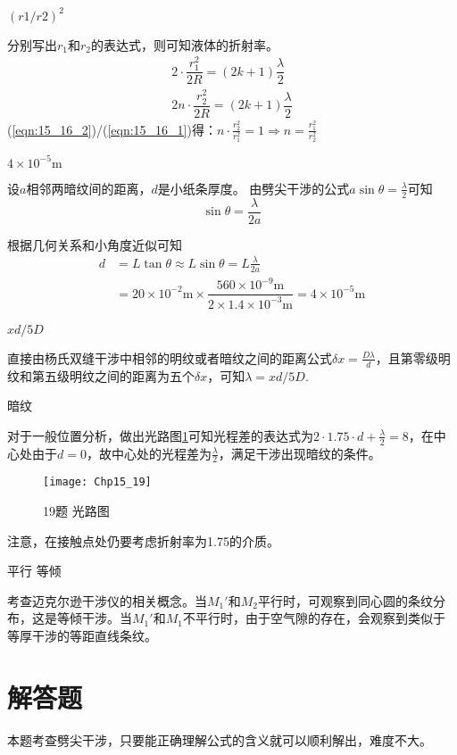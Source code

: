 \exercise $(r1/r2)^2$

\solve 分别写出$r_1$和$r_2$的表达式，则可知液体的折射率。
\begin{gather}
	2\cdot\dfrac{r_1^2}{2R}=(2k+1)\dfrac{\lambda}{2}\label{eqn:15_16_1}\\
	2n\cdot\dfrac{r_2^2}{2R}=(2k+1)\dfrac{\lambda}{2}\label{eqn:15_16_2}
\end{gather}
(\ref{eqn:15_16_2})/(\ref{eqn:15_16_1})得：$n\cdot\frac{r_2^2}{r_1^2}=1\Rightarrow n=\frac{r_1^2}{r_2^2}$


\exercise $4\times10^{-5}\mathrm{m}$

\solve 设$a$相邻两暗纹间的距离，$d$是小纸条厚度。
由劈尖干涉的公式$a\sin\theta=\frac{\lambda}{2}$可知
\[
\sin\theta=\frac{\lambda}{2a}
\]

根据几何关系和小角度近似可知
\begin{align*}
d&=L\tan\theta\approx L\sin\theta=L\frac{\lambda}{2a}\\
&=20\times 10^{-2}\mathrm{m}\times \dfrac{560\times 10^{-9}\mathrm{m}}{2\times 1.4\times 10^{-3}\mathrm{m}}=4\times 10^{-5}\mathrm{m}
\end{align*}

\exercise $xd/5D$

\solve 直接由杨氏双缝干涉中相邻的明纹或者暗纹之间的距离公式$\delta x=\frac{D\lambda}{d}$，且第零级明纹和第五级明纹之间的距离为五个$\delta x$，可知$\lambda=xd/5D$.

\exercise 暗纹

\solve 对于一般位置分析，做出光路图\ref{fig:15_19}可知光程差的表达式为$2\cdot 1.75\cdot d+\frac{\lambda}{2}=8$，在中心处由于$d=0$，故中心处的光程差为$\frac{\lambda}{2}$，满足干涉出现暗纹的条件。
\begin{figure}[!h]
	\centering
	\texttt{[image: Chp15\_19]}
	\caption{19题 光路图}\label{fig:15_19}
\end{figure}

注意，在接触点处仍要考虑折射率为1.75的介质。

\exercise 平行 等倾

\solve 考查迈克尔逊干涉仪的相关概念。当$M_1'$和$M_2$平行时，可观察到同心圆的条纹分布，这是等倾干涉。当$M_1'$和$M_1$不平行时，由于空气隙的存在，会观察到类似于等厚干涉的等距直线条纹。

\section{解答题}
\exercise 

\analysis
本题考查劈尖干涉，只要能正确理解公式的含义就可以顺利解出，难度不大。

